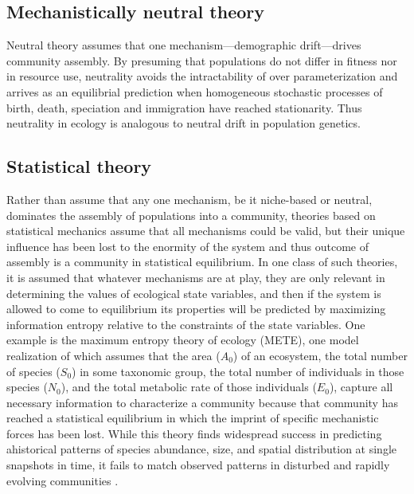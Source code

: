 \documentclass[12pt]{article}
\begin{document}
% 

\subsection{Mechanistically neutral theory}

Neutral theory \citep{Hubbell2001-dx} assumes that one
mechanism---demographic drift---drives community assembly. By
presuming that populations do not differ in fitness nor in resource
use, neutrality avoids the intractability of over parameterization and
arrives as an equilibrial prediction when homogeneous stochastic
processes of birth, death, speciation and immigration have reached
stationarity. Thus neutrality in ecology is analogous to neutral drift
in population genetics.

\subsection{Statistical theory}

Rather than assume that any one mechanism, be it niche-based or
neutral, dominates the assembly of populations into a community,
theories based on statistical mechanics assume that all mechanisms
could be valid, but their unique influence has been lost to the
enormity of the system and thus outcome of assembly is a community in
statistical equilibrium. In one class of such theories, it is assumed
that whatever mechanisms are at play, they are only relevant in
determining the values of ecological state variables, and then if the
system is allowed to come to equilibrium its properties will be
predicted by maximizing information entropy relative to the
constraints of the state variables.  One example is the maximum
entropy theory of ecology (METE), one model realization of which
assumes that the area ($A_0$) of an ecosystem, the total number of species
($S_0$) in some taxonomic group, the total number of individuals in those
species ($N_0$), and the total metabolic rate of those individuals ($E_0$),
capture all necessary information to characterize a community because
that community has reached a statistical equilibrium in which the
imprint of specific mechanistic forces has been lost. While this
theory finds widespread success in predicting ahistorical patterns of
species abundance, size, and spatial distribution \citep{Harte2011-um,
  White2012-yw, Xiao2015-jv, Harte2009-zq} at single snapshots in
time, it fails to match observed patterns in disturbed and rapidly
evolving communities \citep{Rominger2015-kb,Harte2011-um}.
\end{document}
